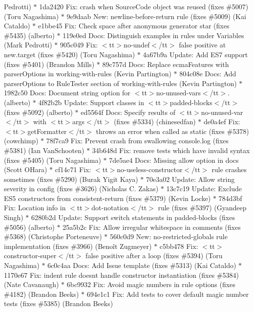 \begin{DoxyItemize}
Pedrotti) \texorpdfstring{$\ast$}{*} 1da2420 Fix\+: crash when Source\+Code object was reused (fixes \#5007) (\+Toru Nagashima) \texorpdfstring{$\ast$}{*} 9e9daab New\+: newline-\/before-\/return rule (fixes \#5009) (\+Kai Cataldo) \texorpdfstring{$\ast$}{*} e1bbe45 Fix\+: Check space after anonymous generator star (fixes \#5435) (alberto) \texorpdfstring{$\ast$}{*} 119e0ed Docs\+: Distinguish examples in rules under Variables (\+Mark Pedrotti) \texorpdfstring{$\ast$}{*} 905c049 Fix\+: $<$tt$>$no-\/undef$<$/tt$>$ false positive at new.\+target (fixes \#5420) (\+Toru Nagashima) \texorpdfstring{$\ast$}{*} 4a67b9a Update\+: Add ES7 support (fixes \#5401) (\+Brandon Mills) \texorpdfstring{$\ast$}{*} 89c757d Docs\+: Replace ecma\+Features with parser\+Options in working-\/with-\/rules (\+Kevin Partington) \texorpdfstring{$\ast$}{*} 804c08e Docs\+: Add parser\+Options to Rule\+Tester section of working-\/with-\/rules (\+Kevin Partington) \texorpdfstring{$\ast$}{*} 1982c50 Docs\+: Document string option for $<$tt$>$no-\/unused-\/vars$<$/tt$>$. (alberto) \texorpdfstring{$\ast$}{*} 4f82b2b Update\+: Support classes in $<$tt$>$padded-\/blocks$<$/tt$>$ (fixes \#5092) (alberto) \texorpdfstring{$\ast$}{*} ed5564f Docs\+: Specify results of $<$tt$>$no-\/unused-\/var$<$/tt$>$ with $<$tt$>$args$<$/tt$>$ (fixes \#5334) (chinesedfan) \texorpdfstring{$\ast$}{*} de0a4ef Fix\+: $<$tt$>$get\+Formatter$<$/tt$>$ throws an error when called as static (fixes \#5378) (cowchimp) \texorpdfstring{$\ast$}{*} 78f7ca9 Fix\+: Prevent crash from swallowing console.\+log (fixes \#5381) (\+Ian Van\+Schooten) \texorpdfstring{$\ast$}{*} 34b648d Fix\+: remove tests which have invalid syntax (fixes \#5405) (\+Toru Nagashima) \texorpdfstring{$\ast$}{*} 7de5ae4 Docs\+: Missing allow option in  docs (\+Scott O\textquotesingle{}\+Hara) \texorpdfstring{$\ast$}{*} cf14c71 Fix\+: $<$tt$>$no-\/useless-\/constructor$<$/tt$>$ rule crashes sometimes (fixes \#5290) (\+Burak Yigit Kaya) \texorpdfstring{$\ast$}{*} 70e3a02 Update\+: Allow string severity in config (fixes \#3626) (\+Nicholas C. Zakas) \texorpdfstring{$\ast$}{*} 13c7c19 Update\+: Exclude ES5 constructors from consistent-\/return (fixes \#5379) (\+Kevin Locke) \texorpdfstring{$\ast$}{*} 784d3bf Fix\+: Location info in $<$tt$>$dot-\/notation$<$/tt$>$ rule (fixes \#5397) (\+Gyandeep Singh) \texorpdfstring{$\ast$}{*} 6280b2d Update\+: Support switch statements in padded-\/blocks (fixes \#5056) (alberto) \texorpdfstring{$\ast$}{*} 25a5b2c Fix\+: Allow irregular whitespace in comments (fixes \#5368) (\+Christophe Porteneuve) \texorpdfstring{$\ast$}{*} 560c0d9 New\+: no-\/restricted-\/globals rule implementation (fixes \#3966) (\+Benoît Zugmeyer) \texorpdfstring{$\ast$}{*} c5bb478 Fix\+: $<$tt$>$constructor-\/super$<$/tt$>$ false positive after a loop (fixes \#5394) (\+Toru Nagashima) \texorpdfstring{$\ast$}{*} 6c0c4aa Docs\+: Add Issue template (fixes \#5313) (\+Kai Cataldo) \texorpdfstring{$\ast$}{*} 1170e67 Fix\+: indent rule doesn\textquotesingle{}t handle constructor instantiation (fixes \#5384) (\+Nate Cavanaugh) \texorpdfstring{$\ast$}{*} 6bc9932 Fix\+: Avoid magic numbers in rule options (fixes \#4182) (\+Brandon Beeks) \texorpdfstring{$\ast$}{*} 694e1c1 Fix\+: Add tests to cover default magic number tests (fixes \#5385) (\+Brandon Beeks) 
\end{DoxyItemize}
